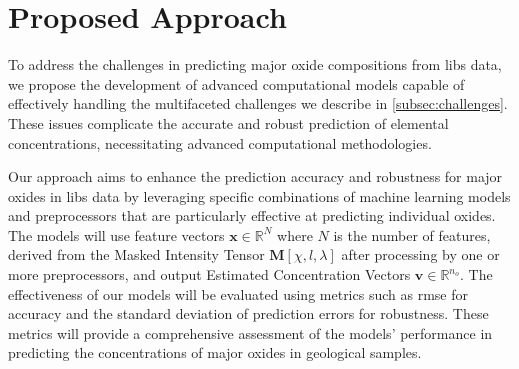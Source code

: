 \section{Proposed Approach}
To address the challenges in predicting major oxide compositions from \gls{libs} data, we propose the development of advanced computational models capable of effectively handling the multifaceted challenges we describe in \ref{subsec:challenges}.
These issues complicate the accurate and robust prediction of elemental concentrations, necessitating advanced computational methodologies. 

Our approach aims to enhance the prediction accuracy and robustness for major oxides in \gls{libs} data by leveraging specific combinations of machine learning models and preprocessors that are particularly effective at predicting individual oxides.
The models will use feature vectors $\mathbf{x} \in \mathbb{R}^N$ where $N$ is the number of features, derived from the Masked Intensity Tensor $\mathbf{M}[\chi, l, \lambda]$ after processing by one or more preprocessors, and output Estimated Concentration Vectors $\mathbf{v} \in \mathbb{R}^{n_o}$. 
The effectiveness of our models will be evaluated using metrics such as \gls{rmse} for accuracy and the standard deviation of prediction errors for robustness.
These metrics will provide a comprehensive assessment of the models' performance in predicting the concentrations of major oxides in geological samples.


